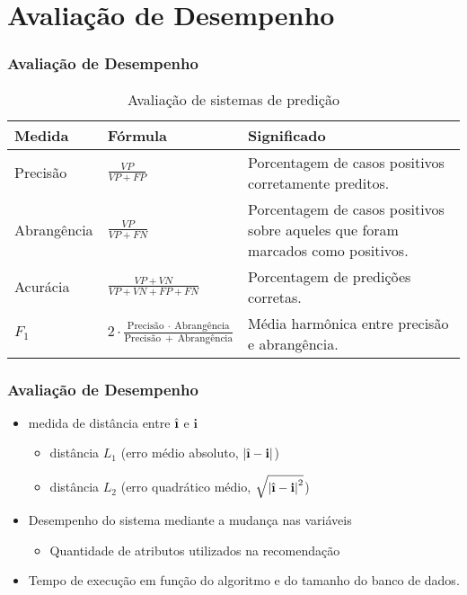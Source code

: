 \section[Avaliação de Desempenho]{Avaliação de Desempenho}
\begin{frame}
\frametitle{Avaliação de Desempenho}


\begin{table}[hp]
\begin{center}
    \caption{Avaliação de sistemas de predição}
    \label{tab:avaliacao-predicao}
    \begin{tabular}{  | p{2cm} | p{4cm} | p{4cm} | }
    \hline
    \textbf{Medida} & \textbf{Fórmula} & \textbf{Significado} \\ \hline
    Precisão &  $\frac{VP}{VP+FP}$ & Porcentagem de casos positivos corretamente preditos. \\ \hline                            
    Abrangência & $\frac{VP}{VP+FN}$ & Porcentagem de casos positivos sobre aqueles que foram marcados como positivos. \\ \hline
    Acurácia & $\frac{VP+VN}{VP+VN+FP+FN}$ & Porcentagem de predições corretas. \\ \hline
    $F_1$ &  $2 \cdot \frac{\mathrm{Precisão}~\cdot~\mathrm{Abrangência}}{\mathrm{Precisão}~+~\mathrm{Abrangência}}$ & Média harmônica entre precisão e abrangência. \\ \hline
    \end{tabular}
\end{center}
\end{table}

\end{frame}


\begin{frame}
\frametitle{Avaliação de Desempenho}

\begin{itemize}
	\item medida de distância entre  $\hat{\textbf{\i}}$ e  $\textbf{i}$
	\begin{itemize}
		\item distância $L_1$ (erro médio absoluto, $\left|\hat{\textbf{\i}} - \textbf{i}\right|$) 
		\item   distância $L_2$ (erro quadrático médio,  $\sqrt{\left|\hat{\textbf{\i}} - \textbf{i}\right|^2}$)
	\end{itemize}
	\item Desempenho do sistema mediante a mudança nas variáveis 
	\begin{itemize}
		\item  Quantidade de atributos utilizados na recomendação
	\end{itemize}
	\item Tempo de execução em função do algoritmo e do tamanho do banco de dados.
\end{itemize}
\end{frame}